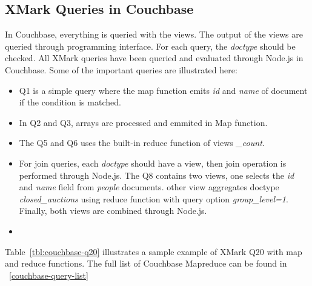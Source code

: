 \subsection{XMark Queries in Couchbase}
 In Couchbase, everything is queried with the views. The output of the views are queried through programming interface. For each query, the \textit{doctype} should be checked.  All XMark queries have been queried and evaluated through Node.js in Couchbase. Some of the important queries are illustrated here:
 \begin{itemize}
 \item Q1 is a simple query where the map function emits \textit{id} and \textit{name} of document if the condition is matched.
 \item In Q2 and Q3, arrays are processed and emmited in Map function. 
 \item The Q5 and Q6 uses the built-in reduce function of views \textit{\_count}.
 \item For join queries, each \textit{doctype} should have a view, then join operation is performed through Node.js. The Q8 contains two views, one selects the \textit{id} and \textit{name} field from \textit{people} documents. other view aggregates doctype  \textit{closed\_auctions} using reduce function with query option \textit{group\_level=1}. Finally, both views are combined through Node.js. 
 
 \item 
 
 \end{itemize}
 
Table~\ref{tbl:couchbase-q20} illustrates a sample example of XMark  Q20 with map and reduce functions. The full list of Couchbase Mapreduce can be found in ~\ref{couchbase-query-list}

